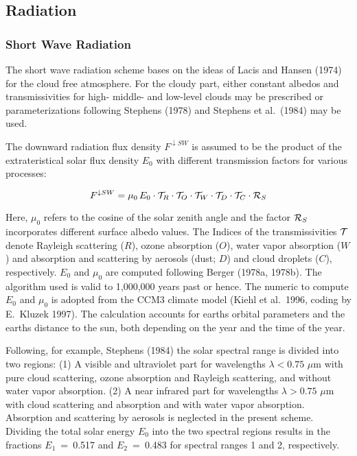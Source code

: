 \newpage

\subsection{Radiation}

\subsubsection{Short Wave Radiation}

The short wave radiation scheme bases
on the ideas of Lacis and Hansen (1974) for the cloud
free
atmosphere. For the cloudy part, either constant
albedos and
transmissivities for high- middle- and low-level clouds
may be prescribed  or parameterizations
following Stephens (1978) and Stephens et al.~(1984)
may be used. 

The downward radiation flux density
$F^{\downarrow SW}$ is assumed to be the
product of the extrateristical solar flux density
$E_0$ with different transmission factors for various
processes:

\begin{equation}
F^{\downarrow SW}= \mu_0 \, E_0 \cdot {\cal T}_R \cdot {\cal T}_O
\cdot {\cal T}_W \cdot {\cal T}_D \cdot
{\cal T}_C \cdot
{\cal R}_S
\end{equation}

Here, $\mu_0$ refers to the cosine of the solar zenith
angle and the factor ${\cal R}_S$ incorporates
different surface
albedo values. The Indices of the transmissivities ${\cal T}$
denote Rayleigh scattering ($R$), ozone
absorption ($O$), water vapor absorption ($W$) and
absorption and scattering by aerosols
(dust; $D$) and cloud droplets ($C$), respectively. 
$E_0$  and $\mu_0$ are computed following 
Berger (1978a, 1978b). The algorithm used is valid to
1,000,000 years past or hence. The numeric to compute
$E_0$ and
$\mu_0$ is adopted from the
CCM3 climate model (Kiehl et al.~1996, coding by E.~Kluzek 1997).
The
calculation accounts
for earths orbital parameters and the earths distance
to the sun, both depending on the year and the time
of the year.

Following, for example, Stephens (1984) the solar
spectral range
is divided into two regions: (1) A visible and
ultraviolet
part for wavelengths $\lambda < 0.75$ $\mu$m with
pure cloud
scattering, ozone absorption and
Rayleigh scattering, and without water vapor
absorption. (2) A
near infrared part  for
wavelengths $\lambda >  0.75$ $\mu$m with cloud
scattering and
absorption and with water vapor absorption.  Absorption
and
scattering by aerosols is neglected in the present
scheme. Dividing
the total solar energy $E_0$ into the two spectral
regions results in the
fractions ${E_1}$~=~0.517 and $E_2$~=~0.483 for
spectral
ranges 1 and 2, respectively.

